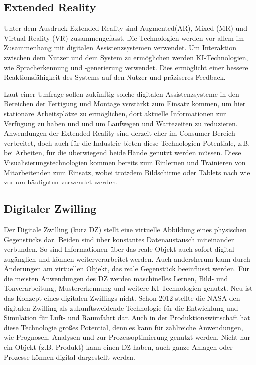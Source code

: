 \documentclass[a4paper,12pt, german]{report}
\begin{document}
\subsection{Extended Reality}
Unter dem Ausdruck Extended Reality sind Augmented(AR), Mixed (MR) und Virtual Reality (VR) zusammengefasst. Die Technologien werden vor allem im Zusammenhang mit digitalen Assistenzsystemen verwendet. Um Interaktion zwischen dem Nutzer und dem System zu ermöglichen werden KI-Technologien, wie Spracherkennung und -generierung verwendet. Dies ermöglicht einer bessere Reaktionsfähigkeit des Systems auf den Nutzer und präziseres Feedback. 

Laut einer Umfrage sollen zukünftig solche digitalen Assistenzsysteme in den Bereichen der Fertigung und Montage verstärkt zum Einsatz kommen, um hier stationäre Arbeitsplätze zu ermöglichen, dort aktuelle Informationen zur Verfügung zu haben und und um Laufwegen und Wartezeiten zu reduzieren. Anwendungen der Extended Reality sind derzeit eher im Consumer Bereich verbreitet, doch auch für die Industrie bieten diese Technologien Potentiale, z.B. bei Arbeiten, für die überwiegend beide Hände genutzt werden müssen. Diese Visualisierungstechnologien kommen bereits zum Einlernen und Trainieren von Mitarbeitenden zum Einsatz, wobei trotzdem Bildschirme oder Tablets nach wie vor am häufigsten verwendet werden.



\subsection{Digitaler Zwilling}
Der Digitale Zwilling (kurz DZ) stellt eine virtuelle Abbildung eines physischen Gegenstücks dar. Beiden sind über konstantes Datenaustausch miteinander verbunden. So sind Informationen über das reale Objekt auch sofort digital zugänglich und können weiterverarbeitet werden. Auch andersherum kann durch Änderungen am virtuellen Objekt, das reale Gegenstück beeinflusst werden. Für die meisten Anwendungen des DZ werden maschinelles Lernen, Bild- und Tonverarbeitung, Mustererkennung und weitere KI-Technologien genutzt.
Neu ist das Konzept eines digitalen Zwillings nicht. Schon 2012 stellte die NASA den digitalen Zwilling als zukunftsweidende Technologie für die Entwicklung und Simulation für Luft- und Raumfahrt dar. Auch in der Produktionswirtschaft hat diese Technologie großes Potential, denn es kann für zahlreiche Anwendungen, wie Prognosen, Analysen und zur Prozessoptimierung genutzt werden. Nicht nur ein Objekt (z.B. Produkt) kann einen DZ haben, auch ganze Anlagen oder Prozesse können digital dargestellt werden. \cite{32}
\end{document}
